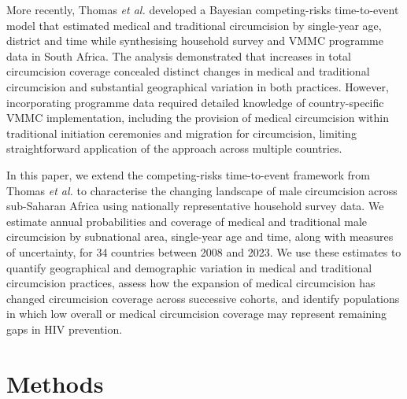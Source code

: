 \documentclass{article}
\begin{document}
\noindent More recently, Thomas {\it et al.} \cite{thomas2024substantial} developed a Bayesian competing-risks time-to-event model that estimated medical and traditional circumcision by single-year age, district and time while synthesising household survey and VMMC programme data in South Africa. The analysis demonstrated that increases in total circumcision coverage concealed distinct changes in medical and traditional circumcision and substantial geographical variation in both practices. However, incorporating programme data required detailed knowledge of country-specific VMMC implementation, including the provision of medical circumcision within traditional initiation ceremonies and migration for circumcision, limiting straightforward application of the approach across multiple countries. 

\noindent In this paper, we extend the competing-risks time-to-event framework from Thomas {\it et al.} \cite{thomas2024substantial} to characterise the changing landscape of male circumcision across sub-Saharan Africa using nationally representative household survey data. We estimate annual probabilities and coverage of medical and traditional male circumcision by subnational area, single-year age and time, along with measures of uncertainty, for 34 countries between 2008 and 2023. We use these estimates to quantify geographical and demographic variation in medical and traditional circumcision practices, assess how the expansion of medical circumcision has changed circumcision coverage across successive cohorts, and identify populations in which low overall or medical circumcision coverage may represent remaining gaps in HIV prevention. 



\section*{Methods}
\end{document}
